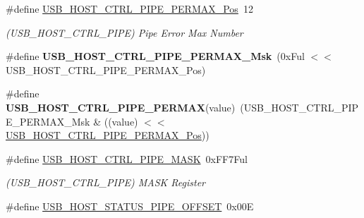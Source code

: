 \begin{DoxyCompactItemize}
\item 
\hypertarget{group___s_a_m_l21___u_s_b_ga9b6f0d5a9481cc6474367eb3aaa1842c}{}\#define \hyperlink{group___s_a_m_l21___u_s_b_ga9b6f0d5a9481cc6474367eb3aaa1842c}{U\+S\+B\+\_\+\+H\+O\+S\+T\+\_\+\+C\+T\+R\+L\+\_\+\+P\+I\+P\+E\+\_\+\+P\+E\+R\+M\+A\+X\+\_\+\+Pos}~12\label{group___s_a_m_l21___u_s_b_ga9b6f0d5a9481cc6474367eb3aaa1842c}

\begin{DoxyCompactList}\small\item\em (U\+S\+B\+\_\+\+H\+O\+S\+T\+\_\+\+C\+T\+R\+L\+\_\+\+P\+I\+P\+E) Pipe Error Max Number \end{DoxyCompactList}\item 
\hypertarget{group___s_a_m_l21___u_s_b_gabbd36f31dc43c5461f474c611323371d}{}\#define {\bfseries U\+S\+B\+\_\+\+H\+O\+S\+T\+\_\+\+C\+T\+R\+L\+\_\+\+P\+I\+P\+E\+\_\+\+P\+E\+R\+M\+A\+X\+\_\+\+Msk}~(0x\+Ful $<$$<$ U\+S\+B\+\_\+\+H\+O\+S\+T\+\_\+\+C\+T\+R\+L\+\_\+\+P\+I\+P\+E\+\_\+\+P\+E\+R\+M\+A\+X\+\_\+\+Pos)\label{group___s_a_m_l21___u_s_b_gabbd36f31dc43c5461f474c611323371d}

\item 
\hypertarget{group___s_a_m_l21___u_s_b_ga9cb865c01aeadc97d6243c3257cd5174}{}\#define {\bfseries U\+S\+B\+\_\+\+H\+O\+S\+T\+\_\+\+C\+T\+R\+L\+\_\+\+P\+I\+P\+E\+\_\+\+P\+E\+R\+M\+A\+X}(value)~(U\+S\+B\+\_\+\+H\+O\+S\+T\+\_\+\+C\+T\+R\+L\+\_\+\+P\+I\+P\+E\+\_\+\+P\+E\+R\+M\+A\+X\+\_\+\+Msk \& ((value) $<$$<$ \hyperlink{group___s_a_m_l21___u_s_b_ga9b6f0d5a9481cc6474367eb3aaa1842c}{U\+S\+B\+\_\+\+H\+O\+S\+T\+\_\+\+C\+T\+R\+L\+\_\+\+P\+I\+P\+E\+\_\+\+P\+E\+R\+M\+A\+X\+\_\+\+Pos}))\label{group___s_a_m_l21___u_s_b_ga9cb865c01aeadc97d6243c3257cd5174}

\item 
\hypertarget{group___s_a_m_l21___u_s_b_gadef4d4de52a184ed1e2d1f9ccb7b6b97}{}\#define \hyperlink{group___s_a_m_l21___u_s_b_gadef4d4de52a184ed1e2d1f9ccb7b6b97}{U\+S\+B\+\_\+\+H\+O\+S\+T\+\_\+\+C\+T\+R\+L\+\_\+\+P\+I\+P\+E\+\_\+\+M\+A\+S\+K}~0x\+F\+F7\+Ful\label{group___s_a_m_l21___u_s_b_gadef4d4de52a184ed1e2d1f9ccb7b6b97}

\begin{DoxyCompactList}\small\item\em (U\+S\+B\+\_\+\+H\+O\+S\+T\+\_\+\+C\+T\+R\+L\+\_\+\+P\+I\+P\+E) M\+A\+S\+K Register \end{DoxyCompactList}\item 
\hypertarget{group___s_a_m_l21___u_s_b_gae558396ac775d9526bbc9549708954c5}{}\#define \hyperlink{group___s_a_m_l21___u_s_b_gae558396ac775d9526bbc9549708954c5}{U\+S\+B\+\_\+\+H\+O\+S\+T\+\_\+\+S\+T\+A\+T\+U\+S\+\_\+\+P\+I\+P\+E\+\_\+\+O\+F\+F\+S\+E\+T}~0x00\+E\label{group___s_a_m_l21___u_s_b_gae558396ac775d9526bbc9549708954c5}


\end{DoxyCompactItemize}
